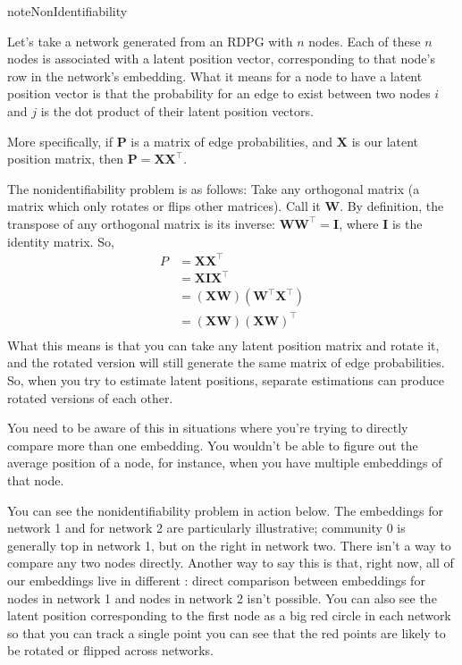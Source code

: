 \documentclass[letterpaper,10pt,english]{jupyterBook}
\begin{document}
\begin{sphinxadmonition}{note}{Non\sphinxhyphen{}Identifiability}

\sphinxAtStartPar
Let’s take a network generated from an RDPG with \(n\) nodes. Each of these \(n\) nodes is associated with a latent position vector, corresponding to that node’s row in the network’s embedding. What it means for a node to have a latent position vector is that the probability for an edge to exist between two nodes \(i\) and \(j\) is the dot product of their latent position vectors.

\sphinxAtStartPar
More specifically, if \(\textbf{P}\) is a matrix of edge probabilities, and \(\textbf{X}\) is our latent position matrix, then \(\textbf{P} = \textbf{X} \textbf{X}^\top\).

\sphinxAtStartPar
The nonidentifiability problem is as follows: Take any orthogonal matrix (a matrix which only rotates or flips other matrices). Call it \(\textbf{W}\). By definition, the transpose of any orthogonal matrix is its inverse: \(\textbf{W} \textbf{W}^\top = \textbf{I}\), where \(\textbf{I}\) is the identity matrix. So,
\label{equation:representations/ch6/multigraph-representation-learning:a3d94e9d-ac1b-44d1-a6b5-0dd9990ceb32}\begin{align}
P &= \textbf{X} \textbf{X}^\top \\
  &= \textbf{X} \textbf{I} \textbf{X}^\top \\
  &= (\textbf{X} \textbf{W}) (\textbf{W}^\top \textbf{X}^\top) \\
  &= (\textbf{X} \textbf{W}) (\textbf{X} \textbf{W})^\top \\
\end{align}
\sphinxAtStartPar
What this means is that you can take any latent position matrix and rotate it, and the rotated version will still generate the same matrix of edge probabilities. So, when you try to estimate latent positions, separate estimations can produce rotated versions of each other.

\sphinxAtStartPar
You need to be aware of this in situations where you’re trying to directly compare more than one embedding. You wouldn’t be able to figure out the average position of a node, for instance, when you have multiple embeddings of that node.
\end{sphinxadmonition}

\sphinxAtStartPar
You can see the nonidentifiability problem in action below. The embeddings for network 1 and for network 2 are particularly illustrative; community 0 is generally top in network 1, but on the right in network two. There isn’t a way to compare any two nodes directly. Another way to say this is that, right now, all of our embeddings live in different : direct comparison between embeddings for nodes in network 1 and nodes in network 2 isn’t possible. You can also see the latent position corresponding to the first node as a big red circle in each network so that you can track a single point \sphinxhyphen{} you can see that the red points are likely to be rotated or flipped across networks.
\end{document}
